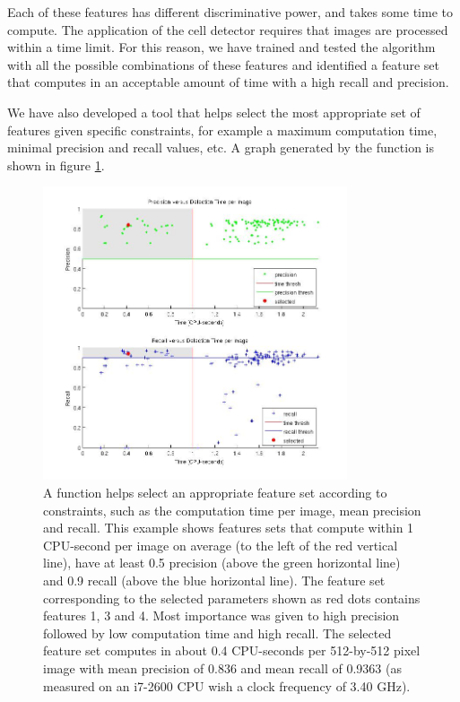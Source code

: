 	Each of these features has different discriminative power, and takes some time to compute. The application of the cell detector requires that images are processed within a time limit. For this reason, we have trained and tested the algorithm with all the possible combinations of these features and identified a feature set that computes in an acceptable amount of time with a high recall and precision.
	
	We have also developed a tool that helps select the most appropriate set of features given specific constraints, for example a maximum computation time, minimal precision and recall values, etc. A graph generated by the function is shown in figure \ref{fig:bestFeatureSelector}.
	
	\begin{figure}[h]
		\centering
		\includegraphics[width=0.8\textwidth]{images/best_features}
		\caption{A function helps select an appropriate feature set according to constraints, such as the computation time per image, mean precision and recall. This example shows features sets that compute within 1 CPU-second per image on average (to the left of the red vertical line), have at least 0.5 precision (above the green horizontal line) and 0.9 recall (above the blue horizontal line). The feature set corresponding to the selected parameters shown as red dots contains features 1, 3 and 4. Most importance was given to high precision followed by low computation time and high recall. The selected feature set computes in about 0.4 CPU-seconds per 512-by-512 pixel image with mean precision of 0.836 and mean recall of 0.9363 (as measured on an i7-2600 CPU wish a clock frequency of 3.40 GHz).}
	    \label{fig:bestFeatureSelector}
	\end{figure}
	
